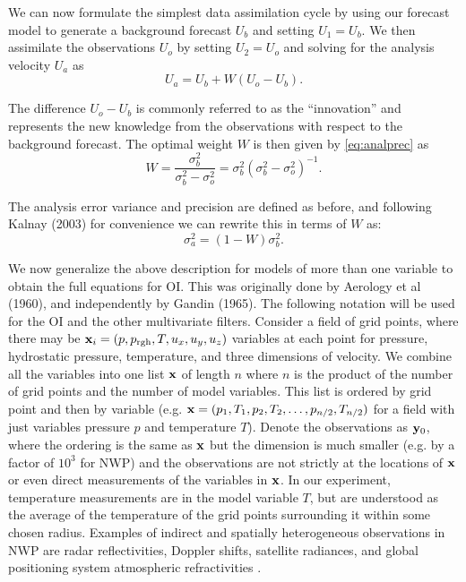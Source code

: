 We can now formulate the simplest data assimilation cycle by using our forecast model to generate a background forecast $U_b$ and setting $U_1 = U_b$.
We then assimilate the observations $U_o$ by setting $U_2 = U_o$ and solving for the analysis velocity $U_a$ as
\begin{equation} U_a = U_b + W (U_o - U_b) .\end{equation}

The difference $U_o - U_b$ is commonly referred to as the ``innovation'' and represents the new knowledge from the observations with respect to the background forecast.
The optimal weight $W$ is then given by \ref{eq:analprec} as
\begin{equation} W = \frac{\sigma _b ^2}{\sigma_b ^2 - \sigma _o ^2} = \sigma_b ^2 (\sigma_b^2 - \sigma_o^2) ^{-1} \label{eq:1dda}.\end{equation}

The analysis error variance and precision are defined as before, and following Kalnay (2003) %
for convenience we can rewrite this in terms of $W$ as:
\begin{equation} \sigma _a ^2 = (1-W ) \sigma_b^2 .\end{equation}

We now generalize the above description for models of more than one variable to obtain the full equations for OI.
This was originally done by Aerology et al (1960), and independently by Gandin (1965). %
The following notation will be used for the OI and the other multivariate filters.
Consider a field of grid points, where there may be $\mathbf{x}_i = (p,p_{\text{rgh}},T,u_x,u_y,u_z)$ variables at each point for pressure, hydrostatic pressure, temperature, and three dimensions of velocity.
We combine all the variables into one list $\mathbf{x}$ of length $n$ where $n$ is the product of the number of grid points and the number of model variables.
This list is ordered by grid point and then by variable (e.g. $\mathbf{x} = (p_1,T_1,p_2,T_2,\ldots,p_{n/2},T_{n/2})$ for a field with just variables pressure $p$ and temperature $T$).
Denote the observations as $\mathbf{y}_0$, where the ordering is the same as $\mathbf{x}$ but the dimension is much smaller (e.g. by a factor of $10^3$ for NWP) %
and the observations are not strictly at the locations of $\mathbf{x}$ or even direct measurements of the variables in $\mathbf{x}$.
In our experiment, temperature measurements are in the model variable $T$, but are understood as the average of the temperature of the grid points surrounding it within some chosen radius.
Examples of indirect and spatially heterogeneous observations in NWP are radar reflectivities, Doppler shifts, satellite radiances, and global positioning system atmospheric refractivities .

